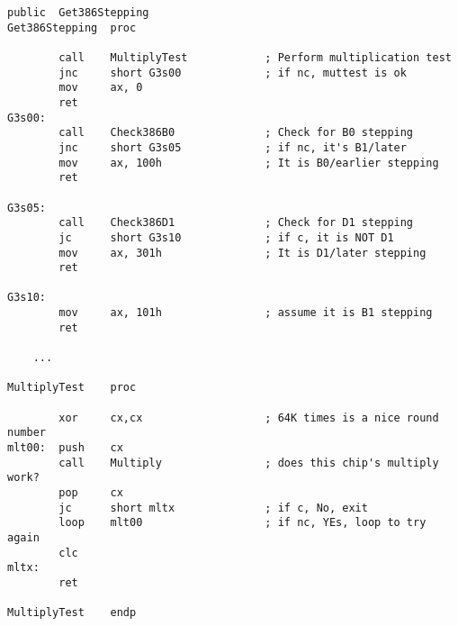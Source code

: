 \begin{lstlisting}[style=customasmx86]
        public  Get386Stepping
Get386Stepping  proc

        call    MultiplyTest            ; Perform multiplication test
        jnc     short G3s00             ; if nc, muttest is ok
        mov     ax, 0
        ret
G3s00:
        call    Check386B0              ; Check for B0 stepping
        jnc     short G3s05             ; if nc, it's B1/later
        mov     ax, 100h                ; It is B0/earlier stepping
        ret

G3s05:
        call    Check386D1              ; Check for D1 stepping
        jc      short G3s10             ; if c, it is NOT D1
        mov     ax, 301h                ; It is D1/later stepping
        ret

G3s10:
        mov     ax, 101h                ; assume it is B1 stepping
        ret

	...

MultiplyTest    proc

        xor     cx,cx                   ; 64K times is a nice round number
mlt00:  push    cx
        call    Multiply                ; does this chip's multiply work?
        pop     cx
        jc      short mltx              ; if c, No, exit
        loop    mlt00                   ; if nc, YEs, loop to try again
        clc
mltx:
        ret

MultiplyTest    endp
\end{lstlisting}



